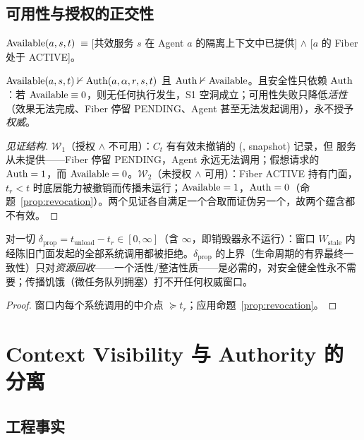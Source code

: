 \section{可用性与授权的正交性}

\begin{definition}[可用性]\label{def:avail}
$\operatorname{Available}(a,s,t)\;\equiv\;$[共效服务 $s$ 在 Agent $a$ 的隔离上下文中已提供] $\wedge$ [$a$ 的 Fiber 处于 ACTIVE]。
\end{definition}

\begin{proposition}\label{prop:orthavail}
$\operatorname{Available}(a,s,t)\nvdash \operatorname{Auth}(a,\alpha,r,s,t)$ 且 $\operatorname{Auth}\nvdash\operatorname{Available}$。且安全性只依赖 $\operatorname{Auth}$：若 $\operatorname{Available}\equiv 0$，则无任何执行发生，S1 空洞成立；可用性失败只降低\emph{活性}（效果无法完成、Fiber 停留 PENDING、Agent 甚至无法发起调用），永不授予\emph{权威}。
\end{proposition}
\begin{proof}[见证结构]
$\mathcal{W}_1$（授权 $\wedge$ 不可用）：$C_t$ 有有效未撤销的 (, snapshot) 记录，但  服务从未提供——Fiber 停留 PENDING，Agent 永远无法调用；假想请求的 $\operatorname{Auth}=1$，而 $\operatorname{Available}=0$。$\mathcal{W}_2$（未授权 $\wedge$ 可用）：Fiber ACTIVE 持有门面，$t_r<t$ 时底层能力被撤销而传播未运行；$\operatorname{Available}=1$，$\operatorname{Auth}=0$（命题~\ref{prop:revocation}）。两个见证各自满足一个合取而证伪另一个，故两个蕴含都不有效。
\end{proof}

\begin{proposition}[传播时序无关性]\label{prop:propagation}
对一切 $\delta_{\mathrm{prop}}=t_{\mathrm{unload}}-t_r\in[0,\infty]$（含 $\infty$，即销毁器永不运行）：窗口 $W_{\mathrm{stale}}$ 内经陈旧门面发起的全部系统调用都被拒绝。$\delta_{\mathrm{prop}}$ 的上界（生命周期的有界最终一致性）只对\emph{资源回收}——一个活性/整洁性质——是必需的，对安全健全性永不需要；传播饥饿（微任务队列拥塞）打不开任何权威窗口。
\end{proposition}
\begin{proof}
窗口内每个系统调用的中介点 $\succeq t_r$；应用命题~\ref{prop:revocation}。
\end{proof}

\chapter{Context Visibility 与 Authority 的分离}\label{ch:ctx}

\section{工程事实}

